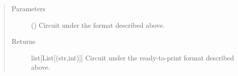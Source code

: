 \documentclass[letterpaper,10pt,english]{sphinxmanual}
\begin{document}
\begin{fulllineitems}
\begin{description}
\end{description}
\begin{quote}\begin{description}
\item[{Parameters}] \leavevmode
{} (\sphinxstyleliteralemphasis{\sphinxupquote{{[}}}\sphinxstyleliteralemphasis{\sphinxupquote{{[}}}\sphinxstyleliteralemphasis{\sphinxupquote{(}}\sphinxstyleliteralemphasis{\sphinxupquote{,}}\sphinxstyleliteralemphasis{\sphinxupquote{)}}\sphinxstyleliteralemphasis{\sphinxupquote{{]}}}\sphinxstyleliteralemphasis{\sphinxupquote{{]}}}) \textendash{} Circuit under the format described 
above.

\item[{Returns}] \leavevmode
list{[}List{[}(str,int){]}{]} \textendash{} Circuit under the ready-to-print format 
described above.

\end{description}\end{quote}

\end{fulllineitems}

\end{document}
